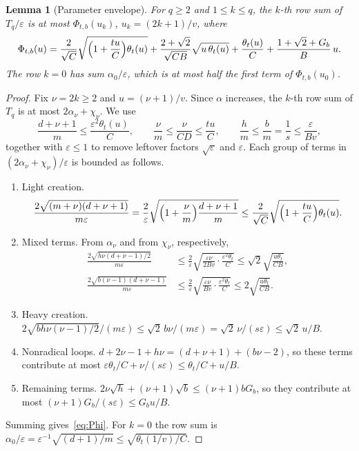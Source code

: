 \documentclass[11pt,a4paper]{article}
\newtheorem{lemma}[theorem]{Lemma}
\theoremstyle{definition}
\theoremstyle{remark}
\newcommand{\eps}{\varepsilon}
\newcommand{\1}{\mathbf 1}
\begin{document}
\begin{lemma}[Parameter envelope]\label{lem:envelope}
For $q\ge2$ and $1\le k\le q$, the $k$-th row sum of $T_q/\eps$ is at
most $\Phi_{t,b}(u_k)$, $u_k=(2k+1)/v$, where
\begin{equation}\label{eq:Phi}
 \Phi_{t,b}(u)=\frac2{\sqrt C}\sqrt{\Bigl(1+\frac{tu}C\Bigr)\theta_t(u)}
 +\frac{2+\sqrt2}{\sqrt{CB}}\sqrt{u\,\theta_t(u)}
 +\frac{\theta_t(u)}C+\frac{1+\sqrt2+G_b}{B}\,u .
\end{equation}
The row $k=0$ has sum $\alpha_0/\eps$, which is at most half the first
term of $\Phi_{t,b}(u_0)$.
\end{lemma}
\begin{proof}
Fix $\nu=2k\ge2$ and $u=(\nu+1)/v$. Since $\alpha$ increases, the $k$-th
row sum of $T_q$ is at most $2\alpha_\nu+\chi_\nu$. We use
\[
 \frac{d+\nu+1}m\le\frac{\eps^2\theta_t(u)}C,\qquad
 \frac\nu m\le\frac{\nu}{CD}\le\frac{tu}C,\qquad
 \frac hm\le\frac bm=\frac1s\le\frac\eps{Bv},
\]
together with $\eps\le1$ to remove leftover factors $\sqrt\eps$ and
$\eps$. Each group of terms in $(2\alpha_\nu+\chi_\nu)/\eps$ is bounded
as follows.
\begin{enumerate}[leftmargin=2em]
\item Light creation.
 \[\frac{2\sqrt{(m+\nu)(d+\nu+1)}}{m\eps}
 =\frac2\eps\sqrt{\Bigl(1+\frac\nu m\Bigr)\frac{d+\nu+1}m}
 \le\frac2{\sqrt C}\sqrt{\Bigl(1+\frac{tu}C\Bigr)\theta_t(u)}.\]
\item Mixed terms. From $\alpha_\nu$ and from $\chi_\nu$, respectively,
 \begin{align*}
 \frac{2\sqrt{h\nu(d+\nu-1)/2}}{m\eps}&\le\frac2\eps
 \sqrt{\frac{\eps\nu}{2Bv}\cdot\frac{\eps^2\theta_t}{C}}
 \le\sqrt2\sqrt{\frac{u\theta_t}{CB}},\\
 \frac{2\sqrt{b(\nu-1)(d+\nu-1)}}{m\eps}&\le\frac2\eps
 \sqrt{\frac{\eps\nu}{Bv}\cdot\frac{\eps^2\theta_t}C}
 \le2\sqrt{\frac{u\theta_t}{CB}}.
 \end{align*}
\item Heavy creation. $2\sqrt{bh\nu(\nu-1)/2}/(m\eps)\le
 \sqrt2\,b\nu/(m\eps)=\sqrt2\,\nu/(s\eps)\le\sqrt2\,u/B$.
\item Nonradical loops. $d+2\nu-1+h\nu=(d+\nu+1)+(b\nu-2)$, so these
 terms contribute at most $\eps\theta_t/C+\nu/(s\eps)\le\theta_t/C+u/B$.
\item Remaining terms. $2\nu\sqrt h+(\nu+1)\sqrt b\le(\nu+1)bG_b$, so
 they contribute at most $(\nu+1)G_b/(s\eps)\le G_bu/B$.
\end{enumerate}
Summing gives~\eqref{eq:Phi}. For $k=0$ the row sum is
$\alpha_0/\eps=\eps^{-1}\sqrt{(d+1)/m}\le\sqrt{\theta_t(1/v)/C}$.
\end{proof}
\end{document}
